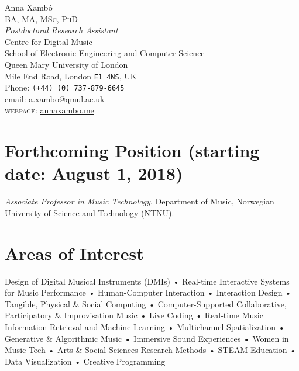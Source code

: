 \documentclass[10pt, a4paper]{article}
\begin{document}
{\Huge Anna Xambó}\\[0.1cm]
\textsc{BA, MA, MSc, PhD}\\[0.9cm]
\emph{Postdoctoral Research Assistant}\\
Centre for Digital Music\\
School of Electronic Engineering and Computer Science\\
Queen Mary University of London\\
Mile End Road, London \texttt{E1 4NS}, UK\\[.2cm]
Phone: \texttt{(+44) (0) 737-879-6645}\\
email: \href{mailto:a.xambo@qmul.ac.uk}{a.xambo@qmul.ac.uk}\\
\textsc{webpage}: \href{http://annaxambo.me/}{annaxambo.me}\\ 


\section*{Forthcoming Position (starting date: August 1, 2018)}
\emph{Associate Professor in Music Technology}, Department of Music, Norwegian University of Science and Technology (NTNU).

\section*{Areas of Interest}
Design of Digital Musical Instruments (DMIs) • Real-time Interactive Systems for Music Performance • Human-Computer Interaction • Interaction Design • Tangible, Physical \& Social Computing • Computer-Supported Collaborative, Participatory \& Improvisation Music • Live Coding • Real-time Music Information Retrieval and Machine Learning • Multichannel Spatialization • Generative \& Algorithmic Music • Immersive Sound Experiences • Women in Music Tech • Arts \& Social Sciences Research Methods • STEAM Education • Data Visualization • Creative Programming

\end{document}
